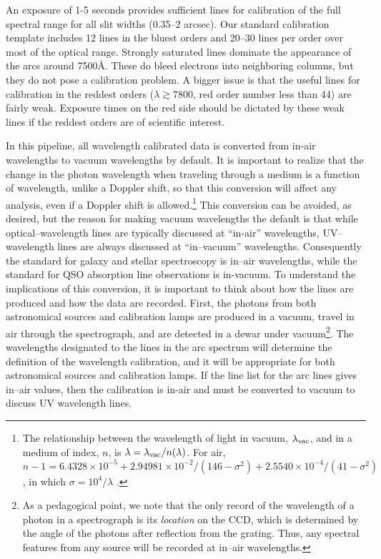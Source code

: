 \documentclass[12pt,preprint]{aastex}
\begin{document}
An exposure of 1-5 seconds provides sufficient lines for calibration
of the full spectral range for all slit widths (0.35--2 arcsec).  Our
standard calibration template includes 12 lines in the bluest orders
and 20--30 lines per order over most of the optical range.  Strongly
saturated lines dominate the appearance of the arcs around
7500\AA. These do bleed electrons into neighboring columns, but
they do not pose a calibration problem.  A bigger issue is that the
useful lines for calibration in the reddest orders 
($\lambda \gtrsim 7800$, 
red order number less than 44) are fairly weak.  Exposure times on the
red side should be dictated by these weak lines if the reddest orders
are of scientific interest.

In this pipeline, all wavelength calibrated data is converted from
in-air wavelengths to vacuum wavelengths by default.  It is important
to realize that the change in the photon wavelength when traveling
through a medium is a function of wavelength, unlike a Doppler shift,
so that this conversion will affect any analysis, even if a Doppler
shift is allowed.\footnote{The relationship between the wavelength of
  light in vacuum, $\lambda_{\rm vac}$, and in a medium of index, $n$,
  is $\lambda = \lambda_{\rm vac}/n(\lambda)$.  For air, $n-1 =
  6.4328\times 10^{-5} + 2.94981\times 10^{-2}/(146-\sigma^2) +
  2.5540\times 10^{-4}/(41-\sigma^2)$, 
  in which $\sigma=10^4/\lambda$ \citep{ciddor96}.}
This conversion can be avoided, as desired, 
but the reason for making vacuum
wavelengths the default is that while optical--wavelength lines are
typically discussed at ``in-air'' wavelengths, UV--wavelength lines
are always discussed at ``in--vacuum'' wavelengths. 
Consequently the
standard for galaxy and stellar spectroscopy is in--air wavelengths,
while the standard for QSO absorption line observations is in-vacuum.
To understand the implications of this conversion, it is important to
think about how the lines are produced and how the data are
recorded.  First, the photons from both astronomical sources and
calibration lamps are produced in a vacuum, travel in air through the
spectrograph, and are detected in a dewar under vacuum\footnote{As a
  pedagogical point, we note that the only record of the wavelength of
  a photon in a spectrograph is its {\it location} on the CCD, which
  is determined by the angle of the photons after reflection from the
  grating.  Thus, any spectral features from any source will be
  recorded at in--air wavelengths.}.  The wavelengths designated to the
lines in the arc spectrum will determine the definition of the
wavelength calibration, and it will be appropriate for both
astronomical sources and calibration lamps.  If the line list for the
arc lines gives in--air values, then the calibration is in-air and
must be converted to vacuum to discuss UV wavelength lines.  
\end{document}
